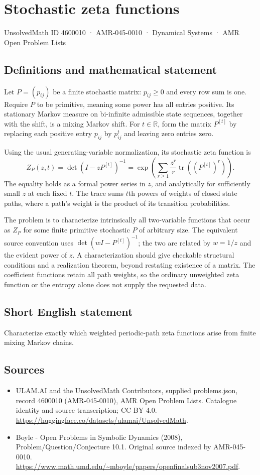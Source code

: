 \documentclass[11pt,a4paper]{article}
\begin{document}
\section*{Stochastic zeta functions}\label{4600010}
{\small UnsolvedMath ID 4600010 · AMR-045-0010 · Dynamical Systems · AMR Open Problem Lists}
\subsection{Definitions and mathematical statement}
Let $P=(p_{ij})$ be a finite stochastic matrix: $p_{ij}\ge0$ and every
row sum is one. Require $P$ to be primitive, meaning some power has all
entries positive. Its stationary Markov measure on bi-infinite admissible
state sequences, together with the shift, is a mixing Markov shift.
For $t\in\mathbb R$, form the matrix $P^{[t]}$ by replacing each positive
entry $p_{ij}$ by $p_{ij}^t$ and leaving zero entries zero.

Using the usual generating-variable normalization, its stochastic zeta
function is
\[
 Z_P(z,t)=\det(I-zP^{[t]})^{-1}
 =\exp\!\left(\sum_{r\ge1}\frac{z^r}{r}
                              \operatorname{tr}((P^{[t]})^r)\right).
\]
The equality holds as a formal power series in $z$, and analytically
for sufficiently small $z$ at each fixed $t$. The trace sums $t$th powers
of weights of closed state paths, where a path's weight is the product
of its transition probabilities.

The problem is to characterize intrinsically all two-variable functions
that occur as $Z_P$ for some finite primitive stochastic $P$ of arbitrary
size. The equivalent source convention uses $\det(wI-P^{[t]})^{-1}$;
the two are related by $w=1/z$ and the evident power of $z$.
A characterization should give checkable structural conditions and a
realization theorem, beyond restating existence of a matrix. The
coefficient functions retain all path weights, so the ordinary unweighted
zeta function or the entropy alone does not supply the requested data.
\subsection{Short English statement}
Characterize exactly which weighted periodic-path zeta functions arise from finite mixing Markov chains.
\subsection{Sources}
\begin{itemize}
\item[S1] ULAM.AI and the UnsolvedMath Contributors, supplied problems.json, record 4600010 (AMR-045-0010), AMR Open Problem Lists. Catalogue identity and source transcription; CC BY 4.0.
\url{https://huggingface.co/datasets/ulamai/UnsolvedMath}.
\item[S2] Boyle - Open Problems in Symbolic Dynamics (2008), Problem/Question/Conjecture 10.1. Original source indexed by AMR-045-0010.
\url{https://www.math.umd.edu/~mboyle/papers/openfinalsub3nov2007.pdf}.
\end{itemize}
\end{document}
